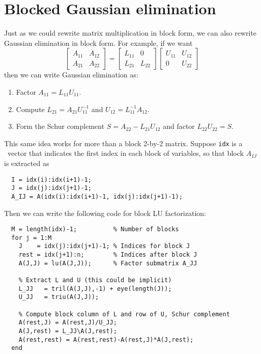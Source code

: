 \documentclass[12pt, leqno]{article} %
\begin{document}
\section{Blocked Gaussian elimination}
Just as we could rewrite matrix multiplication in block form, we can also
rewrite Gaussian elimination in block form.  For example, if we want
\[
  \begin{bmatrix} A_{11} & A_{12} \\ A_{21} & A_{22} \end{bmatrix} =
  \begin{bmatrix} L_{11} & 0 \\ L_{21} & L_{22} \end{bmatrix}
  \begin{bmatrix} U_{11} & U_{12} \\ 0 & U_{22} \end{bmatrix}
\]
then we can write Gaussian elimination as:
\begin{enumerate}
\item
  Factor $A_{11} = L_{11} U_{11}$.
\item
  Compute $L_{21} = A_{21} U_{11}^{-1}$ and $U_{12} = L_{11}^{-1} A_{12}$.
\item
  Form the Schur complement $S = A_{22} - L_{21} U_{12}$ and factor
  $L_{22} U_{22} = S$.
\end{enumerate}

This same idea works for more than a block 2-by-2 matrix.
Suppose {\tt idx} is a \matlab\ vector that indicates the first index
in each block of variables, so that block $A_{IJ}$ is extracted as
\begin{lstlisting}
  I = idx(i):idx(i+1)-1;
  J = idx(j):idx(j+1)-1;
  A_IJ = A(idx(i):idx(i+1)-1, idx(j):idx(j+1)-1);
\end{lstlisting}
Then we can write the following code for block LU factorization:
\begin{lstlisting}
  M = length(idx)-1;          % Number of blocks
  for j = 1:M
    J    = idx(j):idx(j+1)-1; % Indices for block J
    rest = idx(j+1):n;        % Indices after block J
    A(J,J) = lu(A(J,J));      % Factor submatrix A_JJ

    % Extract L and U (this could be implicit)
    L_JJ   = tril(A(J,J),-1) + eye(length(J));
    U_JJ   = triu(A(J,J));

    % Compute block column of L and row of U, Schur complement
    A(rest,J) = A(rest,J)/U_JJ;
    A(J,rest) = L_JJ\A(J,rest);
    A(rest,rest) = A(rest,rest)-A(rest,J)*A(J,rest);
  end
\end{lstlisting}
\end{document}
